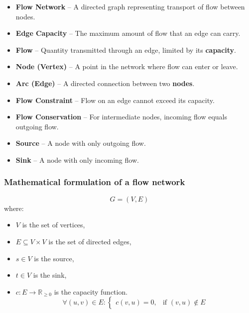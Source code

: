 \begin{itemize}

\item \textbf{Flow Network} -- A directed graph representing transport of flow between nodes.

\item \textbf{Edge Capacity} -- The maximum amount of flow that an edge can carry.

\item \textbf{Flow} -- Quantity transmitted through an edge, limited by its \textbf{capacity}.

\item \textbf{Node (Vertex)} -- A point in the network where flow can enter or leave.

\item \textbf{Arc (Edge)} -- A directed connection between two \textbf{nodes}.

\item \textbf{Flow Constraint} -- Flow on an edge cannot exceed its capacity.

\item \textbf{Flow Conservation} -- For intermediate nodes, incoming flow equals outgoing flow.

\item \textbf{Source} -- A node with only outgoing flow.

\item \textbf{Sink} -- A node with only incoming flow.

\end{itemize}
\subsubsection{Mathematical formulation of a flow network}
\[
G = (V,E)
\]
where:
\begin{itemize}
    \item \(V\) is the set of vertices,
    \item \(E \subseteq V \times V\) is the set of directed edges,
    \item \(s \in V\) is the source,
    \item \(t \in V\) is the sink,
    \item \(c : E \to \mathbb{R}_{\ge 0}\) is the capacity function.
        \[
        \forall (u,v) \in E :
        \begin{cases}
        c(v,u) = 0, & \text{if } (v,u) \notin E
        \end{cases}
    \]
\end{itemize}

